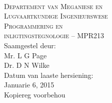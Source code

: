 \begin{titlepage}
    \thispagestyle{empty}
    \begin{center}
        \ \\
        \vspace{1.5cm}
        {\Large
            \textsc{Departement van Meganiese en} \\
            \vspace{0.2cm}
            \textsc{Lugvaartkundige Ingenieurswese}} \\
        \vspace{1.2cm}
        {\huge
            \textsc{Programmering en} \\
            \vspace{0.4em}
            \textsc{inligtingstegnologie -- MPR213}} \\
        \vspace{2.0cm}
        {\large Saamgestel deur:} \\
        \vspace{0.2cm}
        {\large Mr. L G Page} \\
        {\large Dr. D N Wilke} \\
        \vspace{1cm}
        {\large Datum van laaste hersiening:} \\
        \vspace{0.2cm}
        {\large Januarie 6, 2015} \\
        \vspace{1cm}
        {\large Kopiereg voorbehou} \\
    \end{center}
\end{titlepage}

